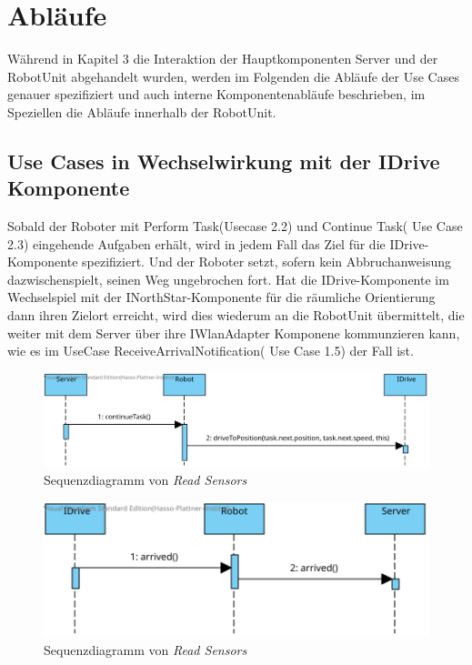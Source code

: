 \section{Abläufe}

Während in Kapitel 3 die Interaktion der Hauptkomponenten Server und der RobotUnit abgehandelt wurden, werden im Folgenden die Abläufe der Use Cases genauer spezifiziert und auch interne Komponentenabläufe beschrieben, im Speziellen die Abläufe innerhalb der RobotUnit.

\subsection*{Use Cases in Wechselwirkung mit der IDrive Komponente }
Sobald der Roboter mit Perform Task(Usecase 2.2)  und Continue Task( Use Case  2.3) eingehende Aufgaben erhält, wird in jedem Fall das Ziel für die IDrive-Komponente spezifiziert. 
Und der Roboter setzt, sofern kein Abbruchanweisung dazwischenspielt, seinen Weg ungebrochen fort. Hat die IDrive-Komponente im Wechselspiel mit der INorthStar-Komponente für die räumliche Orientierung dann ihren Zielort erreicht, wird dies wiederum an die RobotUnit übermittelt, die weiter mit dem Server über ihre IWlanAdapter Komponene kommunzieren kann, wie es im UseCase ReceiveArrivalNotification( Use Case 1.5) der Fall ist.
\\

		\begin{figure}[H]
		\centering
		\includegraphics[width=1\textwidth]{img/2-Entwurf-ContinueTask.svg}
		\caption{Sequenzdiagramm von \emph{Read Sensors}}
		\label{ReadSensors}
	\end{figure}
	
	\begin{figure}[H]
		\centering
		\includegraphics[width=1\textwidth]{img/2-Entwurf-ReceiveArrivalNotification.svg}
		\caption{Sequenzdiagramm von \emph{Read Sensors}}
		\label{ReadSensors}
	\end{figure}


